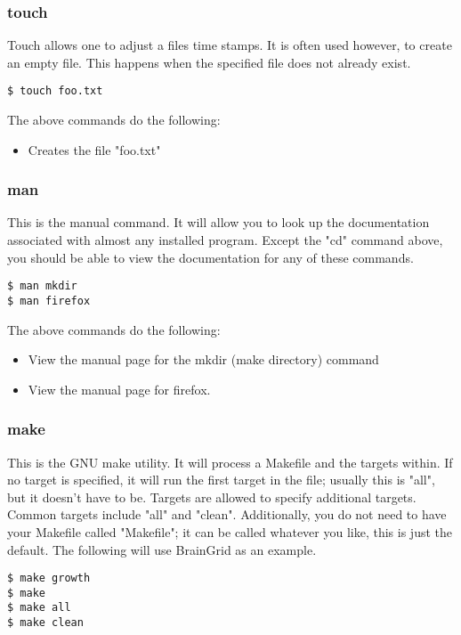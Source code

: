 \subsubsection{touch} \mdseries
Touch allows one to adjust a files time stamps.  It is often used however, to create an empty file.  This happens when the specified file does not already exist.

\begin{lstlisting}
$ touch foo.txt
\end{lstlisting}

The above commands do the following:
	\begin{itemize}
		\item Creates the file "foo.txt"
	\end{itemize}

\subsubsection{man} \mdseries
This is the manual command.  It will allow you to look up the documentation associated with almost any installed program.  Except the "cd" command above, you should be able to view the documentation for any of these commands.

\begin{lstlisting}
$ man mkdir
$ man firefox
\end{lstlisting}

The above commands do the following:
	\begin{itemize}
		\item View the manual page for the mkdir (make directory) command
		\item View the manual page for firefox.
	\end{itemize}


\subsubsection{make} \mdseries
This is the GNU make utility.  It will process a Makefile and the targets within.  If no target is specified, it will run the first target in the file; usually this is "all", but it doesn't have to be.  Targets are allowed to specify additional targets.  Common targets include "all" and "clean".  Additionally, you do not need to have your Makefile called "Makefile"; it can be called whatever you like, this is just the default.  The following will use BrainGrid as an example.  

\begin{lstlisting}
$ make growth
$ make
$ make all
$ make clean
\end{lstlisting}

